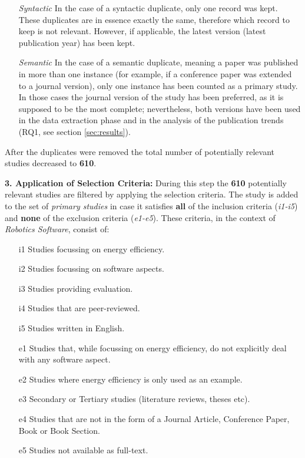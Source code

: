 \vspace{1mm}

\begin{enumerate}
    \item[\textit{Syntactic}] In the case of a syntactic duplicate, only one record was kept. 
    These duplicates are in essence exactly the same, therefore which record to keep is not relevant.
    However, if applicable, the latest version (latest publication year) has been kept.

    \item[\textit{Semantic}] In the case of a semantic duplicate, meaning a paper was published in more than one instance 
    (for example, if a conference paper was extended to a journal version), only one instance has been counted as a primary study. 
    In those cases the journal version of the study has been preferred, as it is supposed to be the most complete; nevertheless, 
    both versions have been used in the data extraction phase and in the analysis of the publication trends (RQ1, see section \ref{sec:results}).

\end{enumerate}
After the duplicates were removed the total number of potentially relevant studies decreased to \textbf{610}.

\vspace{5mm}

\noindent\textbf{3. Application of Selection Criteria:}
During this step the \textbf{610} potentially relevant studies are filtered by applying the selection criteria. 
The study is added to the set of \textit{primary studies} in case it satisfies \textbf{all} of the inclusion criteria (\textit{i1-i5}) and \textbf{none} of the exclusion criteria (\textit{e1-e5}). 
These criteria, in the context of \textit{Robotics Software}, consist of:
\begin{itemize}
	\item[i1] Studies focussing on energy efficiency.
    \item[i2] Studies focussing on software aspects.
    \item[i3] Studies providing evaluation.
    \item[i4] Studies that are peer-reviewed.
    \item[i5] Studies written in English.
    
	\item[e1] Studies that, while focussing on energy efficiency, do not explicitly deal with any software aspect.
    \item[e2] Studies where energy efficiency is only used as an example.
    \item[e3] Secondary or Tertiary studies (literature reviews, theses etc).
    \item[e4] Studies that are not in the form of a Journal Article, Conference Paper, Book or Book Section.
    \item[e5] Studies not available as full-text.
\end{itemize}


